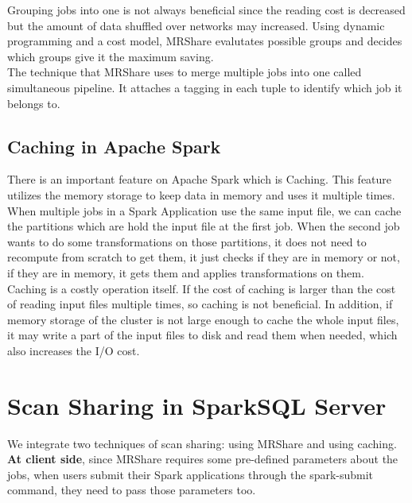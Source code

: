 Grouping jobs into one is not always beneficial since the reading cost is decreased but the amount of data shuffled over networks may increased. Using dynamic programming and a cost model, MRShare evalutates possible groups and decides which groups give it the maximum saving.\\
The technique that MRShare uses to merge multiple jobs into one called simultaneous pipeline. It attaches a tagging in each tuple to identify which job it belongs to.\\

\subsection{Caching in Apache Spark}


There is an important feature on Apache Spark which is Caching. This feature utilizes the memory storage to keep data in memory and uses it multiple times. When multiple jobs in a Spark Application use the same input file, we can cache the partitions which are hold the input file at the first job. When the second job wants to do some transformations on those partitions, it does not need to recompute from scratch to get them, it just checks if they are in memory or not, if they are in memory, it gets them and applies transformations on them.\\

Caching is a costly operation itself. If the cost of caching is larger than the cost of reading input files multiple times, so caching is not beneficial. In addition, if memory storage of the cluster is not large enough to cache the whole input files, it may write a part of the input files to disk and read them when needed, which also increases the I/O cost.\\
		
\section{Scan Sharing in SparkSQL Server}
We integrate two techniques of scan sharing: using MRShare and using caching. \\
\textbf{At client side}, since MRShare requires some pre-defined parameters about the jobs, when users submit their Spark applications through the spark-submit command, they need to pass those parameters too.\\

